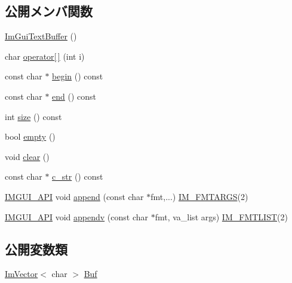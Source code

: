\subsection*{公開メンバ関数}
\begin{DoxyCompactItemize}
\item 
\mbox{\hyperlink{struct_im_gui_text_buffer_a4c4369c5e65f591554428b947c498d0d}{Im\+Gui\+Text\+Buffer}} ()
\item 
char \mbox{\hyperlink{struct_im_gui_text_buffer_a8550f53463fd12711e3d08b740227bd4}{operator\mbox{[}$\,$\mbox{]}}} (int i)
\item 
const char $\ast$ \mbox{\hyperlink{struct_im_gui_text_buffer_aab6d83c6b9a8061287a4cb6135c1cab4}{begin}} () const
\item 
const char $\ast$ \mbox{\hyperlink{struct_im_gui_text_buffer_a2fc30ad0d384f98dfcea722f798d91f2}{end}} () const
\item 
int \mbox{\hyperlink{struct_im_gui_text_buffer_a2811fcd43e0224eb3bd0f3464b634289}{size}} () const
\item 
bool \mbox{\hyperlink{struct_im_gui_text_buffer_afdef38ae725bb5495f0143170fa902c8}{empty}} ()
\item 
void \mbox{\hyperlink{struct_im_gui_text_buffer_a9e4edc9f950bc9e35d5c3b3071dbc0df}{clear}} ()
\item 
const char $\ast$ \mbox{\hyperlink{struct_im_gui_text_buffer_afb03439bc91723e274bfb9d247a691b9}{c\+\_\+str}} () const
\item 
\mbox{\hyperlink{imgui_8h_a43829975e84e45d1149597467a14bbf5}{I\+M\+G\+U\+I\+\_\+\+A\+PI}} void \mbox{\hyperlink{struct_im_gui_text_buffer_a791ac3e5638c58b53772e14bee1323db}{append}} (const char $\ast$fmt,...) \mbox{\hyperlink{imgui_8h_a1251c2f9ddac0873dbad8181bd82c9f1}{I\+M\+\_\+\+F\+M\+T\+A\+R\+GS}}(2)
\item 
\mbox{\hyperlink{imgui_8h_a43829975e84e45d1149597467a14bbf5}{I\+M\+G\+U\+I\+\_\+\+A\+PI}} void \mbox{\hyperlink{struct_im_gui_text_buffer_ad7c7e0d7ec1a12dd2a96a3dbb204deaf}{appendv}} (const char $\ast$fmt, va\+\_\+list args) \mbox{\hyperlink{imgui_8h_a047693beb7f899f5deab1e20202016b3}{I\+M\+\_\+\+F\+M\+T\+L\+I\+ST}}(2)
\end{DoxyCompactItemize}
\subsection*{公開変数類}
\begin{DoxyCompactItemize}
\item 
\mbox{\hyperlink{class_im_vector}{Im\+Vector}}$<$ char $>$ \mbox{\hyperlink{struct_im_gui_text_buffer_aa6de034b1920cdae5505cc58abf14240}{Buf}}
\end{DoxyCompactItemize}


